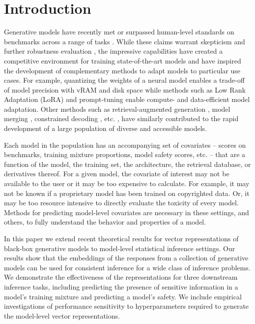 \section{Introduction}
Generative models have recently met or surpassed human-level standards on benchmarks across a range of tasks \citep{nori2023capabilitiesgpt4medicalchallenge, katz2024gpt, dubey2024llama}. 
While these claims warrant skepticism and further robustness evaluation \citep{ness2024medfuzzexploringrobustnesslarge}, the impressive capabilities have created a competitive environment for training state-of-the-art models and have inspired the development of complementary methods to adapt models to particular use cases.
For example, quantizing the weights of a neural model enables a trade-off of model precision with vRAM and disk space \citep{gholami2022survey} while methods such as Low Rank Adaptation (LoRA) \citep{hu2021lora} and prompt-tuning \citep{lester2021power} enable compute- and data-efficient model adaptation. 
Other methods such as retrieval-augmented generation \citep{rag}, model merging \citep{model-merging}, constrained decoding \citep{constrained-decoding}, etc. \citep{dettmers2024qlora, graphrag}, have similarly contributed to the rapid development of a large population of diverse and accessible models.

Each model in the population has an accompanying set of covariates – scores on benchmarks, training mixture proportions, model safety scores, etc. – that are a function of the model, the training set, the architecture, the retrieval database, or derivatives thereof. 
For a given model, the covariate of interest may not be available to the user or it may be too expensive to calculate.
For example, it may not be known if a proprietary model has been trained on copyrighted data.
Or, it may be too resource intensive to directly evaluate the toxicity of every model.
Methods for predicting model-level
covariates are necessary in these settings, and others, to fully understand the behavior and properties
of a model.

In this paper we extend recent theoretical results for vector representations of black-box generative models \citep{aranyak} to model-level statistical inference settings.
Our results show that the embeddings of the responses from a collection of generative models can be used for consistent inference for a wide class of inference problems.
We demonstrate the effectiveness of the representations for three downstream inference tasks, including predicting the presence of sensitive information in a model's training mixture and predicting a model's safety. 
We include empirical investigations of performance sensitivity to hyperparameters required to generate the model-level vector representations. 

